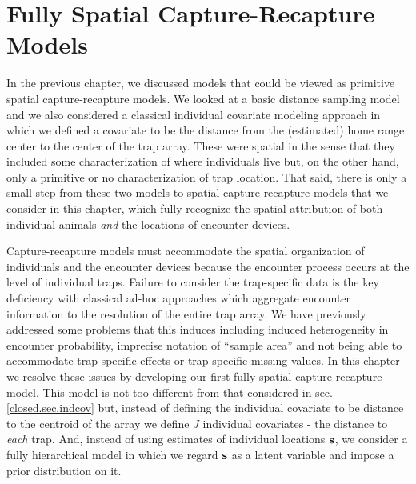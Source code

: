 




\chapter{Fully Spatial Capture-Recapture Models}
\label{chapt.scr0}

\vspace{.3in}

In the previous chapter, we discussed models that could be
viewed as primitive spatial capture-recapture models. We looked at a
basic distance sampling model and we also considered a classical
individual covariate modeling approach in which we defined a covariate
to be the distance from the (estimated) home range center to the center of
the trap array. These were spatial in the sense that they included
some characterization of where individuals live but, on the other
hand, only a primitive or no characterization of trap location.  That
said, there is only a small step from these two models to spatial
capture-recapture models that we consider in this chapter, which fully
recognize the spatial attribution of both individual animals {\it and}
the locations of encounter devices.

Capture-recapture models must accommodate the spatial organization of
individuals and the encounter devices because the encounter process
occurs at the level of individual traps.  Failure to consider the
trap-specific data is the key deficiency with classical ad-hoc
approaches which aggregate encounter information to the resolution of
the entire trap array. We have previously addressed some problems that
this induces including induced heterogeneity in encounter probability,
imprecise notation of ``sample area'' and not being able to
accommodate trap-specific effects or trap-specific missing values.  In
this chapter we resolve these issues by developing our first fully
spatial capture-recapture model. This model is not too different from
that considered in sec. \ref{closed.sec.indcov} but, instead of
defining the individual covariate to be distance to the centroid of
the array we define $J$ individual covariates - the distance to {\it
  each} trap. And, instead of using estimates of individual locations
${\bf s}$, we consider a fully hierarchical model in which we regard
${\bf s}$ as a latent variable and impose a prior distribution on it.

